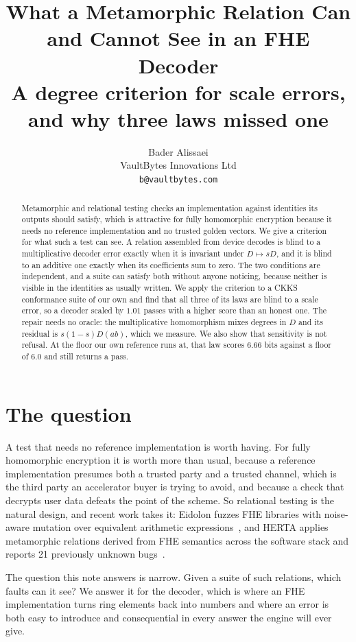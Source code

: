 \documentclass[11pt,a4paper]{article}
\title{What a Metamorphic Relation Can and Cannot See in an FHE Decoder\\[2mm]
\large A degree criterion for scale errors, and why three laws missed one}
\author{Bader Alissaei\\ \small VaultBytes Innovations Ltd\\ \small \texttt{b@vaultbytes.com}}
\date{}
\begin{document}
\maketitle

\begin{abstract}
Metamorphic and relational testing checks an implementation against identities its outputs should
satisfy, which is attractive for fully homomorphic encryption because it needs no reference
implementation and no trusted golden vectors. We give a criterion for what such a test can see. A
relation assembled from device decodes is blind to a multiplicative decoder error exactly when it is
invariant under $D \mapsto sD$, and it is blind to an additive one exactly when its coefficients sum
to zero. The two conditions are independent, and a suite can satisfy both without anyone noticing,
because neither is visible in the identities as usually written. We apply the criterion to a CKKS
conformance suite of our own and find that all three of its laws are blind to a scale error, so a
decoder scaled by $1.01$ passes with a higher score than an honest one. The repair needs no oracle:
the multiplicative homomorphism mixes degrees in $D$ and its residual is $s(1-s)D(ab)$, which we
measure. We also show that sensitivity is not refusal. At the floor our own reference runs at, that
law scores $6.66$ bits against a floor of $6.0$ and still returns a pass.
\end{abstract}

\section{The question}

A test that needs no reference implementation is worth having. For fully homomorphic encryption it
is worth more than usual, because a reference implementation presumes both a trusted party and a
trusted channel, which is the third party an accelerator buyer is trying to avoid, and because a
check that decrypts user data defeats the point of the scheme. So relational testing is the natural
design, and recent work takes it: Eidolon fuzzes FHE libraries with noise-aware mutation over
equivalent arithmetic expressions~\cite{eidolon}, and HERTA applies metamorphic relations derived
from FHE semantics across the software stack and reports 21 previously unknown
bugs~\cite{herta}.

The question this note answers is narrow. Given a suite of such relations, which faults can it see?
We answer it for the decoder, which is where an FHE implementation turns ring elements back into
numbers and where an error is both easy to introduce and consequential in every answer the engine
will ever give.
\end{document}
